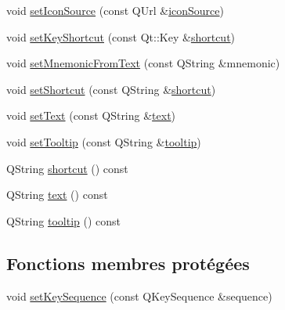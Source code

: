 \begin{DoxyCompactItemize}
void \hyperlink{classSimpleHotel_1_1SH__ExtendedQQmlAction_af81c3330e02238f5cbfe5d5b287695ab}{set\-Icon\-Source} (const Q\-Url \&\hyperlink{classSimpleHotel_1_1SH__ExtendedQQmlAction_aa433667cea05e90667ff9753cd5b543c}{icon\-Source})
\item 
void \hyperlink{classSimpleHotel_1_1SH__ExtendedQQmlAction_a4e55c5b5882454b1a2ae03561da99aa2}{set\-Key\-Shortcut} (const Qt\-::\-Key \&\hyperlink{classSimpleHotel_1_1SH__ExtendedQQmlAction_a66dd0d938ca4bbf2a69ec3e5f2c9cb3b}{shortcut})
\item 
void \hyperlink{classSimpleHotel_1_1SH__ExtendedQQmlAction_aad36c9addcfbd2e2765cde1cd54f69b6}{set\-Mnemonic\-From\-Text} (const Q\-String \&mnemonic)
\item 
void \hyperlink{classSimpleHotel_1_1SH__ExtendedQQmlAction_a72ce84e2fb997fb4b9dc70f5d6f17237}{set\-Shortcut} (const Q\-String \&\hyperlink{classSimpleHotel_1_1SH__ExtendedQQmlAction_a66dd0d938ca4bbf2a69ec3e5f2c9cb3b}{shortcut})
\item 
void \hyperlink{classSimpleHotel_1_1SH__ExtendedQQmlAction_a5ba76040e3a1e2f5b1fe8e4059ade2b0}{set\-Text} (const Q\-String \&\hyperlink{classSimpleHotel_1_1SH__ExtendedQQmlAction_a258fdf949b62536b794a0a01b4f9a2a1}{text})
\item 
void \hyperlink{classSimpleHotel_1_1SH__ExtendedQQmlAction_a1ecfeb91b59df8d0e9e51b67c6835247}{set\-Tooltip} (const Q\-String \&\hyperlink{classSimpleHotel_1_1SH__ExtendedQQmlAction_a740949c3e220c7d4f34e9dcbd7690646}{tooltip})
\item 
Q\-String \hyperlink{classSimpleHotel_1_1SH__ExtendedQQmlAction_a63684513c98d925803e42b153a1d5c34}{shortcut} () const 
\item 
Q\-String \hyperlink{classSimpleHotel_1_1SH__ExtendedQQmlAction_a7601e3f7de921cd81d0e6e6bd8c3f1df}{text} () const 
\item 
Q\-String \hyperlink{classSimpleHotel_1_1SH__ExtendedQQmlAction_a182c5f68e59fe9e0e11e20a0ae7d35dd}{tooltip} () const 
\end{DoxyCompactItemize}
\subsection*{Fonctions membres protégées}
\begin{DoxyCompactItemize}
\item 
void \hyperlink{classSimpleHotel_1_1SH__ExtendedQQmlAction_aaf4ee351bd2af1519c7e671407577d80}{set\-Key\-Sequence} (const Q\-Key\-Sequence \&sequence)
\end{DoxyCompactItemize}
